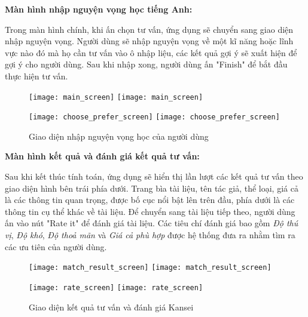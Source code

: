 \pagebreak
\textbf{Màn hình nhập nguyện vọng học tiếng Anh:}
\vskip 0.1in

Trong màn hình chính, khi ấn chọn tư vấn, ứng dụng sẽ chuyển sang giao diện nhập nguyện vọng. Người dùng sẽ nhập nguyện vọng về một kĩ năng hoặc lĩnh vực nào đó mà họ cần tư vấn vào ô nhập liệu, các kết quả gợi ý sẽ xuất hiện để gợi ý cho người dùng. Sau khi nhập xong, người dùng ấn "Finish" để bắt đầu thực hiện tư vấn.\\  

\begin{figure}[H]
  \begin{minipage}[b]{0.50\linewidth}
  	\centering
      \ifpdf
      \texttt{[image: main\_screen]}
    \else
      \texttt{[image: main\_screen]}
    \fi  	
  \end{minipage}
    \begin{minipage}[b]{0.50\linewidth}
  	\centering
      \ifpdf
      \texttt{[image: choose\_prefer\_screen]}
    \else
      \texttt{[image: choose\_prefer\_screen]}
    \fi  	
  \end{minipage}
    \caption{Giao diện nhập nguyện vọng học của người dùng}
    \label{PreferenceInquiryScreen}
\end{figure}

\pagebreak
\textbf{Màn hình kết quả và đánh giá kết quả tư vấn:}
\vskip 0.1in

Sau khi kết thúc tính toán, ứng dụng sẽ hiển thị lần lượt các kết quả tư vấn theo giao diện hình bên trái phía dưới. Trang bìa tài liệu, tên tác giả, thể loại, giá cả là các thông tin quan trọng, được bố cục nổi bật lên trên đầu, phía dưới là các thông tin cụ thể khác về tài liệu. Để chuyển sang tài liệu tiếp theo, người dùng ấn vào nút "Rate it" để đánh giá tài liệu. Các tiêu chí đánh giá bao gồm \textit{Độ thú vị}, \textit{Độ khó}, \textit{Độ thoả mãn} và \textit{Giá cả phù hợp} được hệ thống đưa ra nhằm tìm ra các ưu tiên của người dùng.\\

\begin{figure}[H]
  \begin{minipage}[b]{0.50\linewidth}
  	\centering
      \ifpdf
      \texttt{[image: match\_result\_screen]}
    \else
      \texttt{[image: match\_result\_screen]}
    \fi  	
  \end{minipage}
    \begin{minipage}[b]{0.50\linewidth}
  	\centering
      \ifpdf
      \texttt{[image: rate\_screen]}
    \else
      \texttt{[image: rate\_screen]}
    \fi  	
  \end{minipage}
    \caption{Giao diện kết quả tư vấn và đánh giá Kansei}
    \label{RecommendedResultScreen}
\end{figure}

